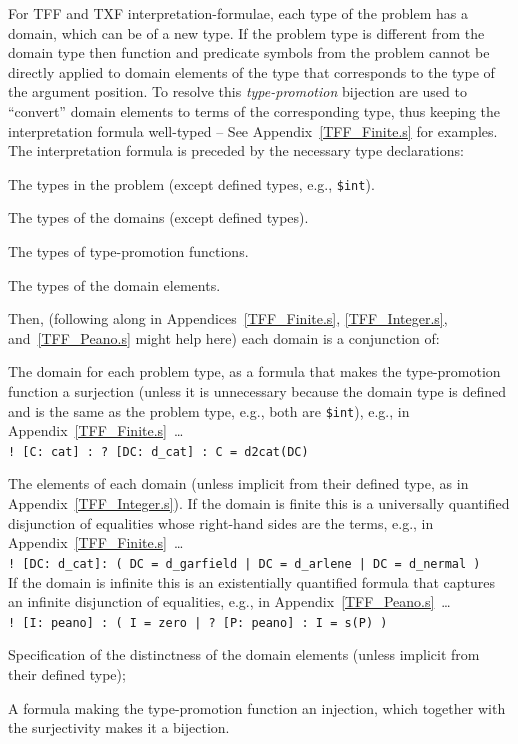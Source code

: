 \documentclass{easychair}
\newcommand{\smalltt}[1]{\small \texttt{#1}}
\newenvironment{packed_itemize}{
\vspace*{-0.2em}
\begin{itemize}
\setlength{\partopsep}{0pt}
\setlength{\itemsep}{1pt}
\setlength{\parskip}{0pt}
\setlength{\parsep}{0pt}
}{\end{itemize}}
\begin{document}
For TFF and TXF interpretation-formulae, each type of the problem has a domain, which can be of 
a new type.
If the problem type is different from the domain type then function and predicate symbols from 
the problem cannot be directly applied to domain elements of the type that corresponds to the type
of the argument position.
To resolve this {\em type-promotion} bijection are used to ``convert'' domain elements to terms 
of the corresponding type, thus keeping the interpretation formula well-typed -- See
Appendix~\ref{TFF_Finite.s} for examples.
The interpretation formula is preceded by the necessary type declarations:
\begin{packed_itemize}
\item The types in the problem (except defined types, e.g., {\smalltt{\$int}}).
\item The types of the domains (except defined types).
\item The types of type-promotion functions.
\item The types of the domain elements.
\end{packed_itemize}
Then, (following along in Appendices~\ref{TFF_Finite.s}, \ref{TFF_Integer.s}, and~\ref{TFF_Peano.s} 
might help here) each domain is a conjunction of:
\begin{packed_itemize}
\item The domain for each problem type, as a formula that makes the type-promotion function a 
      surjection (unless it is unnecessary because the domain type is defined and is the same as 
      the problem type, e.g., both are {\smalltt{\$int}}), e.g., in 
      Appendix~\ref{TFF_Finite.s}~\ldots\\
      \hspace*{0.5cm}\smalltt{! [C: cat] : ? [DC: d\_cat] : C = d2cat(DC)}
\item The elements of each domain (unless implicit from their defined type, as in
      Appendix~\ref{TFF_Integer.s}). 
      If the domain is finite this is a universally quantified disjunction of equalities whose 
      right-hand sides are the terms, e.g., in Appendix~\ref{TFF_Finite.s}~\ldots\\
      \hspace*{0.5cm}\smalltt{! [DC: d\_cat]: ( DC = d\_garfield | DC = d\_arlene | DC = d\_nermal )}\\
      If the domain is infinite this is an existentially quantified formula that captures an 
      infinite disjunction of equalities, e.g., in Appendix~\ref{TFF_Peano.s}~\ldots\\
      \hspace*{0.5cm}\smalltt{! [I: peano] : ( I = zero | ? [P: peano] : I = s(P) )}
\item Specification of the distinctness of the domain elements (unless implicit from their
      defined type);
\item A formula making the type-promotion function an injection,
      which together with the surjectivity makes it a bijection.
\end{packed_itemize}
\end{document}
